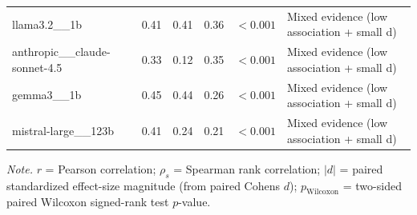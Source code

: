 \begin{table}[htbp]
\begin{tabular}{l r r r r l}
    llama3.2\_\_1b & 0.41 & 0.41 & 0.36 & $<0.001$ & Mixed evidence (low association + small d) \\
    anthropic\_\_claude-sonnet-4.5 & 0.33 & 0.12 & 0.35 & $<0.001$ & Mixed evidence (low association + small d) \\
    gemma3\_\_1b & 0.45 & 0.44 & 0.26 & $<0.001$ & Mixed evidence (low association + small d) \\
    mistral-large\_\_123b & 0.41 & 0.24 & 0.21 & $<0.001$ & Mixed evidence (low association + small d) \\
\bottomrule
\end{tabular}
\vspace{0.4em}
\footnotesize
\textit{Note.} $r$ = Pearson correlation; $\rho_s$ = Spearman rank correlation; $|d|$ = paired standardized effect-size magnitude (from paired Cohens $d$); $p_{\text{Wilcoxon}}$ = two-sided paired Wilcoxon signed-rank test $p$-value.
\end{table}